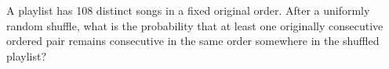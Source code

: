 A playlist has 108 distinct songs in a fixed original order. After a uniformly random shuffle, what is the probability that at least one originally consecutive ordered pair remains consecutive in the same order somewhere in the shuffled playlist?
